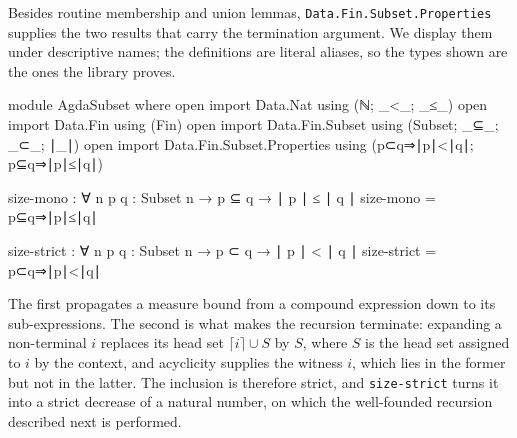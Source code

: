 \documentclass[preprint,12pt]{elsarticle}
\theoremstyle{definition}
\begin{document}
Besides routine membership and union lemmas, \lstinline{Data.Fin.Subset.Properties}
supplies the two results that carry the termination argument. We display them
under descriptive names; the definitions are literal aliases, so the types shown
are the ones the library proves.
\begin{code}[hide]
module AgdaSubset where
  open import Data.Nat using (ℕ; _<_; _≤_)
  open import Data.Fin using (Fin)
  open import Data.Fin.Subset using (Subset; _⊆_; _⊂_; ∣_∣)
  open import Data.Fin.Subset.Properties using (p⊂q⇒∣p∣<∣q∣; p⊆q⇒∣p∣≤∣q∣)
\end{code}
\begin{code}
  size-mono   : ∀ {n} {p q : Subset n} → p ⊆ q → ∣ p ∣ ≤ ∣ q ∣
  size-mono   = p⊆q⇒∣p∣≤∣q∣

  size-strict : ∀ {n} {p q : Subset n} → p ⊂ q → ∣ p ∣ < ∣ q ∣
  size-strict = p⊂q⇒∣p∣<∣q∣
\end{code}
The first propagates a measure bound from a compound expression down to its
sub-expressions. The second is what makes the recursion terminate: expanding a
non-terminal $i$ replaces its head set $\lceil i \rceil \cup S$ by $S$, where
$S$ is the head set assigned to $i$ by the context, and acyclicity supplies the
witness $i$, which lies in the former but not in the latter. The inclusion is
therefore strict, and \lstinline{size-strict} turns it into a strict decrease of
a natural number, on which the well-founded recursion described next is
performed.
\end{document}
